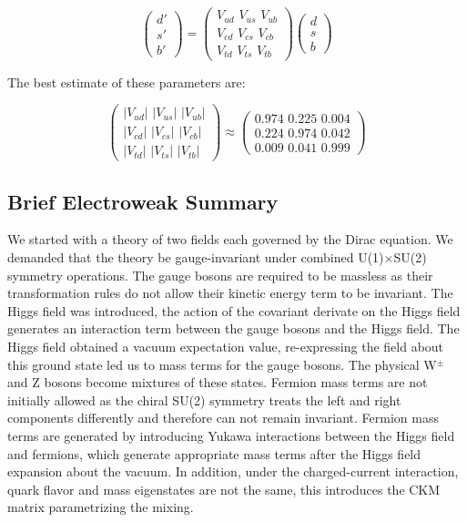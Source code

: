 \begin{equation}
\label{eq:ckmv}
\begin{pmatrix} d' \\ s' \\ b' \end{pmatrix} =
\begin{pmatrix} V_{ud} \,\, V_{us}  \,\, V_{ub} \\ V_{cd} \,\, V_{cs} \,\, V_{cb}  \\ V_{td} \,\, V_{ts} \,\, V_{tb} \end{pmatrix}
\begin{pmatrix} d \\ s \\ b \end{pmatrix}
\end{equation}

The best estimate of these parameters \cite{ckm} are:

\begin{equation}
\label{eq:ckmval}
\begin{pmatrix} |V_{ud}| \,\, |V_{us}|  \,\, |V_{ub}| \\ |V_{cd}| \,\, |V_{cs}| \,\, |V_{cb}|  \\ |V_{td}| \,\, |V_{ts}| \,\, |V_{tb}| \end{pmatrix} \approx
\begin{pmatrix} 0.974 \,\, 0.225  \,\, 0.004 \\ 0.224 \,\, 0.974 \,\, 0.042  \\ 0.009 \,\, 0.041 \,\, 0.999 \end{pmatrix}
\end{equation}

\subsection{Brief Electroweak Summary}

We started with a theory of two fields each governed by the Dirac equation. We demanded that the theory be gauge-invariant under combined U(1)$\times$SU(2) symmetry operations. The gauge bosons are required to be massless as their transformation rules do not allow their kinetic energy term to be invariant. The Higgs field was introduced, the action of the covariant derivate on the Higgs field generates an interaction term between the gauge bosons and the Higgs field. The Higgs field obtained a vacuum expectation value, re-expressing the field about this ground state led us to mass terms for the gauge bosons. The physical W$^{\pm}$ and Z bosons become mixtures of these states. Fermion mass terms are not initially allowed as the chiral SU(2) symmetry treats the left and right components differently and therefore can not remain invariant. Fermion mass terms are generated by introducing Yukawa interactions between the Higgs field and fermions, which generate appropriate mass terms after the Higgs field expansion about the vacuum. In addition, under the charged-current interaction, quark flavor and mass eigenstates are not the same, this introduces the CKM matrix parametrizing the mixing.

